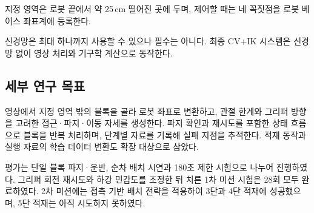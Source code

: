 지정 영역은 로봇 끝에서 약 25\,cm 떨어진 곳에 두며, 제어할 때는 네 꼭짓점을 로봇 베이스 좌표계에 등록한다.

신경망은 최대 하나까지 사용할 수 있으나 필수는 아니다. 최종 CV+IK 시스템은 신경망 없이 영상 처리와 기구학 계산으로 동작한다.

\subsection{세부 연구 목표}
영상에서 지정 영역 밖의 블록을 골라 로봇 좌표로 변환하고, 관절 한계와 그리퍼 방향을 고려한 접근·파지·이동 자세를 생성한다. 파지 확인과 재시도를 포함한 상태 흐름으로 블록을 반복 처리하며, 단계별 자료를 기록해 실패 지점을 추적한다. 적재 동작과 실행 자료의 학습 데이터 변환도 확장 대상으로 삼았다.

평가는 단일 블록 파지·운반, 순차 배치 시연과 180초 제한 시험으로 나누어 진행하였다. 그리퍼 회전 재시도와 하강 민감도를 조정한 뒤 치른 1차 미션 시험은 28회 모두 완료하였다. 2차 미션에는 접촉 기반 배치 전략을 적용하여 3단과 4단 적재에 성공했으며, 5단 적재는 아직 시도하지 못하였다.
\FloatBarrier

